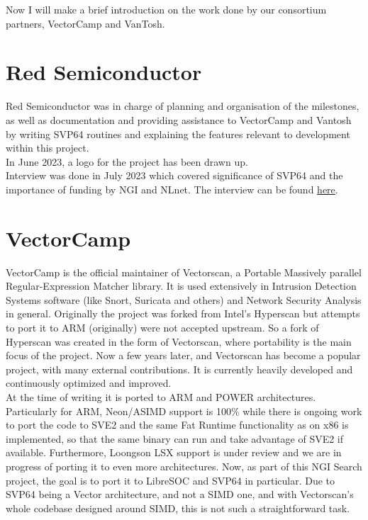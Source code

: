 Now I will make a brief introduction on the work done by our consortium
partners, VectorCamp and VanTosh.

\section{Red Semiconductor}

Red Semiconductor was in charge of planning and organisation of the milestones,
as well as documentation and providing assistance to VectorCamp and Vantosh
by writing SVP64 routines and explaining the features relevant to development
within this project.\\

In June 2023, a logo for the project has been drawn up.\\

Interview was done in July 2023 which covered significance of SVP64 and
the importance of funding by NGI and NLnet.
The interview can be found
\href{https://spaces.fundingbox.com/spaces/ngi-community-ngi-innovators/64b8dadbabf7a659885ee01e}{here}.

\section{VectorCamp}

VectorCamp is the official maintainer of Vectorscan, a Portable Massively
parallel Regular-Expression Matcher library. It is used extensively in
Intrusion Detection Systems software (like Snort, Suricata and others)
and Network Security Analysis in general. Originally the project was forked
from Intel’s Hyperscan but attempts to port it to ARM (originally) were not
accepted upstream. So a fork of Hyperscan was created in the form of
Vectorscan, where portability is the main focus of the project.
Now a few years later, and Vectorscan has become a popular project,
with many external contributions. It is currently heavily developed and
continuously optimized and improved.\\

At the time of writing it is ported
to ARM and POWER architectures. Particularly for ARM, Neon/ASIMD support
is 100\% while there is ongoing work to port the code to SVE2 and
the same Fat Runtime functionality as on x86 is implemented,
so that the same binary can run and take advantage of SVE2 if available.
Furthermore, Loongson LSX support is under review and we are in progress of
porting it to even more architectures.
Now, as part of this NGI Search project, the goal is to port it to LibreSOC
and SVP64 in particular. Due to SVP64 being a Vector architecture,
and not a SIMD one, and with Vectorscan’s whole codebase designed around SIMD,
this is not such a straightforward task.\\

